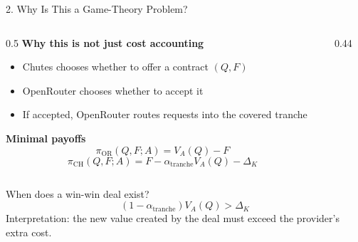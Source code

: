 \documentclass[aspectratio=169,10pt]{beamer}
\begin{document}
\begin{frame}{2. Why Is This a Game-Theory Problem?}
\begin{columns}[T]
\begin{column}{0.5\textwidth}
\textbf{Why this is not just cost accounting}
\begin{itemize}
    \item Chutes chooses whether to offer a contract $(Q,F)$
    \item OpenRouter chooses whether to accept it
    \item If accepted, OpenRouter routes requests into the covered tranche
\end{itemize}

\vspace{0.15cm}
\textbf{Minimal payoffs}
\[
\pi_{\mathrm{OR}}(Q,F;A) = V_A(Q) - F
\]
\[
\pi_{\mathrm{CH}}(Q,F;A) = F - \alpha_{\mathrm{tranche}}V_A(Q) - \Delta_K
\]
\end{column}

\begin{column}{0.44\textwidth}
\centering
{}
\end{column}
\end{columns}

\vspace{0.15cm}
\begin{alertblock}{When does a win-win deal exist?}
\small
\[
(1-\alpha_{\mathrm{tranche}})V_A(Q) > \Delta_K
\]
Interpretation: the new value created by the deal must exceed the provider's extra cost.
\end{alertblock}
\end{frame}
\end{document}
